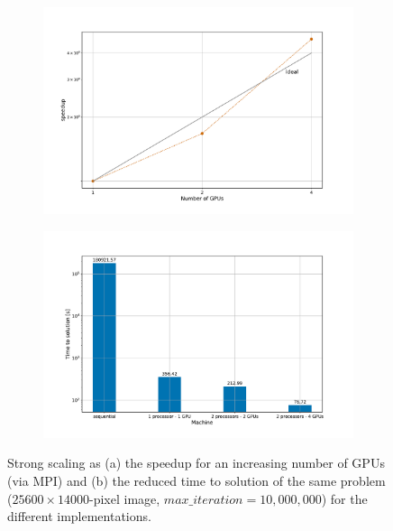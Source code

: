 \documentclass[11pt,a4paper]{article}
\begin{document}
\begin{figure}[t]
	\vspace{-0.5cm}
	\centering
	\begin{subfigure}{.5\textwidth}
		\centering
		\includegraphics[width=.99\linewidth, clip, trim={1.5cm 1cm 2.5cm 2cm}]{strong-mpi.pdf}
		\caption{} 
		\label{fig:strong-mpi}
	\end{subfigure}%
	\begin{subfigure}{.5\textwidth}
		\centering
		\includegraphics[width=.99\linewidth, clip, trim={1.5cm 1cm 2.5cm 2cm}]{strong-tts.pdf}
		\caption{} 
		\label{fig:strong-tts}
	\end{subfigure}
	\vspace{-0.4cm}
	\caption{Strong scaling as (a) the speedup for an increasing number of GPUs (via MPI) and (b) the reduced time to solution of the same problem ($25600\times14000$-pixel image, $max\_iteration=10,000,000$) for the different implementations.}
	\label{fig:strong}
\vspace{0.3cm}
\end{figure}
\end{document}
